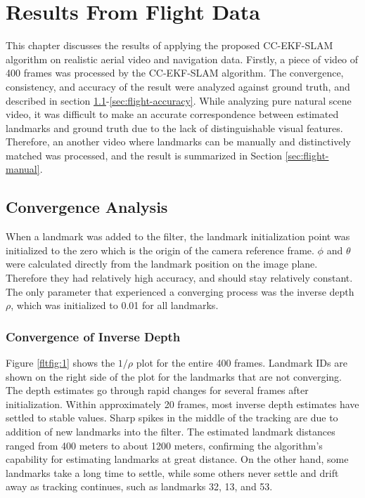 \chapter{Results From Flight Data}\label{ch:FlightResult}

This chapter discusses the results of applying the proposed
CC-EKF-SLAM algorithm on realistic aerial video and navigation data.
Firstly, a piece of video of 400 frames was processed by the
CC-EKF-SLAM algorithm. The convergence, consistency, and accuracy of
the result were analyzed against ground truth, and described in
section \ref{sec:flight-converge}-\ref{sec:flight-accuracy}. While
analyzing pure natural scene video, it was difficult to make an accurate
correspondence between estimated landmarks and ground truth due to the
lack of distinguishable visual features. Therefore, an another video
where landmarks can be manually and distinctively matched was
processed, and the result is summarized in Section
\ref{sec:flight-manual}.

\section{Convergence Analysis}\label{sec:flight-converge}
When a landmark was added to the filter, the landmark initialization
point was initialized to the zero which is the origin of the camera
reference frame. $\phi$ and $\theta$ were calculated directly from
the landmark position on the image plane. Therefore they had relatively
high accuracy, and should stay relatively constant. The only parameter
that experienced a converging process was the inverse depth $\rho$,
which was initialized to 0.01 for all landmarks.

\subsection{Convergence of Inverse Depth}
Figure \ref{fltfig:1} shows the $1/\rho$ plot for the entire 400
frames. Landmark IDs are shown on the right side of the plot for the
landmarks that are not converging. The depth estimates go through
rapid changes for several frames after initialization. Within
approximately 20 frames, most inverse depth estimates have settled to stable
values. Sharp spikes in the middle of the tracking are due to
addition of new landmarks into the filter. The estimated
landmark distances ranged from 400 meters to about 1200 meters,
confirming the algorithm's capability for estimating landmarks at
great distance. On the other hand, some landmarks take a long time to
settle, while some others never settle and drift away as tracking
continues, such as landmarks 32, 13, and 53.

